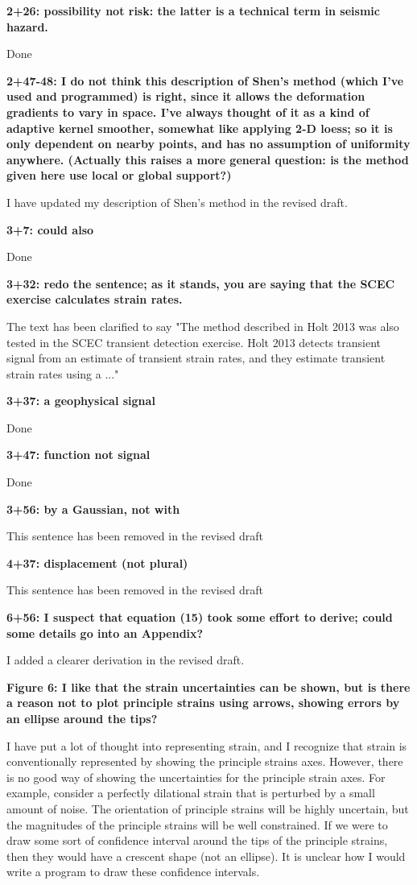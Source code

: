 \documentclass[10pt,a4paper]{letter}
\begin{document}
\begin{letter}{}
\textbf{2+26: possibility not risk: the latter is a technical term in seismic
hazard.}

Done

\textbf{2+47-48: I do not think this description of Shen’s method (which I’ve
used and programmed) is right, since it allows the deformation
gradients to vary in space. I’ve always thought of it as a kind of
adaptive kernel smoother, somewhat like applying 2-D loess; so it is
only dependent on nearby points, and has no assumption of uniformity
anywhere. (Actually this raises a more general question: is the method
given here use local or global support?)}

I have updated my description of Shen's method in the revised draft.

\textbf{3+7: could also}

Done 

\textbf{3+32: redo the sentence; as it stands, you are saying that the SCEC
exercise calculates strain rates.}

The text has been clarified to say "The method described in Holt 2013
was also tested in the SCEC transient detection exercise. Holt 2013
detects transient signal from an estimate of transient strain rates,
and they estimate transient strain rates using a ..."

\textbf{3+37: a geophysical signal}

Done

\textbf{3+47: function not signal}

Done

\textbf{3+56: by a Gaussian, not with}

This sentence has been removed in the revised draft

\textbf{4+37: displacement (not plural)}

This sentence has been removed in the revised draft

\textbf{6+56: I suspect that equation (15) took some effort to derive; could
some details go into an Appendix?}

I added a clearer derivation in the revised draft.

\textbf{Figure 6: I like that the strain uncertainties can be shown, but is
there a reason not to plot principle strains using arrows, showing
errors by an ellipse around the tips?}

I have put a lot of thought into representing strain, and I recognize
that strain is conventionally represented by showing the principle
strains axes. However, there is no good way of showing the
uncertainties for the principle strain axes. For example, consider a
perfectly dilational strain that is perturbed by a small amount of
noise. The orientation of principle strains will be highly uncertain,
but the magnitudes of the principle strains will be well constrained.
If we were to draw some sort of confidence interval around the tips of
the principle strains, then they would have a crescent shape (not an
ellipse). It is unclear how I would write a program to draw these
confidence intervals.


\end{letter}
\end{document}
